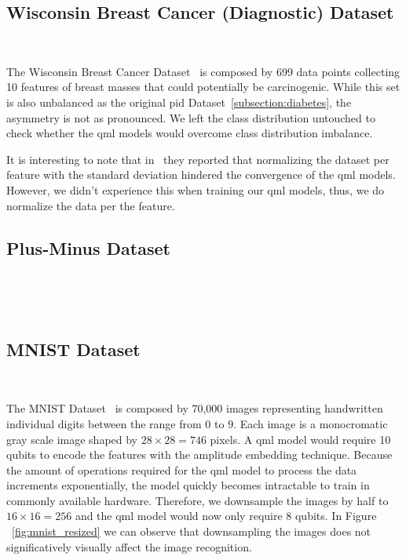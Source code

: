 \subsection{Wisconsin Breast Cancer (Diagnostic) Dataset} \

The Wisconsin Breast Cancer Dataset~\cite{street_nuclear_1993} is
composed by 699 data points collecting 10 features of breast masses
that could potentially be carcinogenic. While this set is also
unbalanced as the original \ac{pid} Dataset~\ref{subsection:diabetes},
the asymmetry is not as pronounced. We left the class distribution
untouched to check whether the \ac{qml} models would overcome class
distribution imbalance. \

It is interesting to note that in~\cite{winderl_quantum_2023}
they reported that normalizing the dataset per feature with the
standard deviation hindered the convergence of the \ac{qml} models.
However, we didn't experience this when training our \ac{qml} models,
thus, we do normalize the data per the feature. \

\subsection{Plus-Minus Dataset} \

~\cite{wendlinger_comparative_2024}

\subsection{MNIST Dataset} \

The MNIST Dataset~\cite{bottou_comparison_1994} is composed by
70,000 images representing handwritten individual digits between
the range from \(0\) to \(9\). Each image is a monocromatic gray scale
image shaped by \(28 \times 28 = 746\) pixels. A \ac{qml} model would
require 10 qubits to encode the features with the amplitude embedding
technique. Because the amount of operations required for the
\ac{qml} model to process the data increments exponentially, the model
quickly becomes intractable to train in commonly available hardware.
Therefore, we downsample the images by half to \(16 \times 16 = 256\) and
the \ac{qml} model would now only require 8 qubits. In Figure
~\ref{fig:mnist_resized} we can observe that downsampling the images
does not significatively visually affect the image recognition. \

